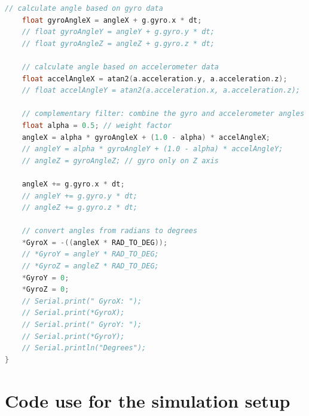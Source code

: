 \documentclass{article}
\begin{document}
\begin{lstlisting}[language=C, caption=Arduino Nano Code]
    // calculate angle based on gyro data
    float gyroAngleX = angleX + g.gyro.x * dt;
    // float gyroAngleY = angleY + g.gyro.y * dt;
    // float gyroAngleZ = angleZ + g.gyro.z * dt;

    // calculate angle based on accelerometer data
    float accelAngleX = atan2(a.acceleration.y, a.acceleration.z);
    // float accelAngleY = atan2(a.acceleration.x, a.acceleration.z);

    // complementary filter: combine the gyro and accelerometer angles
    float alpha = 0.5; // weight factor
    angleX = alpha * gyroAngleX + (1.0 - alpha) * accelAngleX;
    // angleY = alpha * gyroAngleY + (1.0 - alpha) * accelAngleY;
    // angleZ = gyroAngleZ; // gyro only on Z axis

    angleX += g.gyro.x * dt;
    // angleY += g.gyro.y * dt;
    // angleZ += g.gyro.z * dt;

    // convert angles from radians to degrees
    *GyroX = -((angleX * RAD_TO_DEG));
    // *GyroY = angleY * RAD_TO_DEG;
    // *GyroZ = angleZ * RAD_TO_DEG;
    *GyroY = 0;
    *GyroZ = 0;
    // Serial.print(" GyroX: ");
    // Serial.print(*GyroX);
    // Serial.print(" GyroY: ");
    // Serial.print(*GyroY);
    // Serial.println("Degrees");
}
\end{lstlisting}
\newpage
\section{Code use for the simulation setup}
\end{document}
